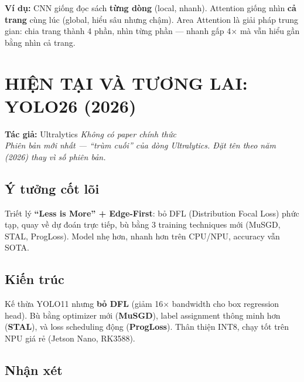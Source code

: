 \documentclass[12pt,a4paper]{report}
\begin{document}
\textbf{Ví dụ:} CNN giống đọc sách \textbf{từng dòng} (local, nhanh). Attention giống nhìn \textbf{cả trang} cùng lúc (global, hiểu sâu nhưng chậm). Area Attention là giải pháp trung gian: chia trang thành 4 phần, nhìn từng phần --- nhanh gấp 4$\times$ mà vẫn hiểu gần bằng nhìn cả trang.













\chapter{HIỆN TẠI VÀ TƯƠNG LAI: YOLO26 (2026)}

\textbf{Tác giả:} Ultralytics \hfill \textit{Không có paper chính thức} \cite{yolo26}\\
\textit{Phiên bản mới nhất --- ``trùm cuối'' của dòng Ultralytics. Đặt tên theo năm (2026) thay vì số phiên bản.}

\section{Ý tưởng cốt lõi}
Triết lý \textbf{``Less is More'' + Edge-First}: bỏ DFL (Distribution Focal Loss) phức tạp, quay về dự đoán trực tiếp, bù bằng 3 training techniques mới (MuSGD, STAL, ProgLoss). Model nhẹ hơn, nhanh hơn trên CPU/NPU, accuracy vẫn SOTA.

\section{Kiến trúc}
Kế thừa YOLO11 nhưng \textbf{bỏ DFL} (giảm 16$\times$ bandwidth cho box regression head). Bù bằng optimizer mới (\textbf{MuSGD}), label assignment thông minh hơn (\textbf{STAL}), và loss scheduling động (\textbf{ProgLoss}). Thân thiện INT8, chạy tốt trên NPU giá rẻ (Jetson Nano, RK3588).

\section{Nhận xét}
\end{document}
